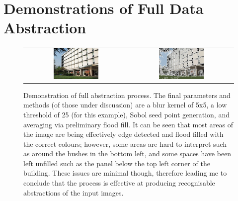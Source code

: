\chapter{Demonstrations of Full Data Abstraction}

\begin{figure}[h]
    \begin{center}
    \begin{tabular}{ c c }
        \includegraphics[width=0.45\textwidth]{Figures/building.jpg} &
        \includegraphics[width=0.45\textwidth]{Figures/Final.jpg} \\
    \end{tabular}
    \caption[Demonstration of full abstraction process]{Demonstration of full abstraction process. The final parameters and methods (of those under discussion) are a blur kernel of 5x5, a low threshold of 25 (for this example), Sobol seed point generation, and averaging via preliminary flood fill. It can be seen that most areas of the image are being effectively edge detected and flood filled with the correct colours; however, some areas are hard to interpret such as around the bushes in the bottom left, and some spaces have been left unfilled such as the panel below the top left corner of the building. These issues are minimal though, therefore leading me to conclude that the process is effective at producing recognisable abstractions of the input images.}
    \label{fig:Final}
    \end{center}
\end{figure}
        
